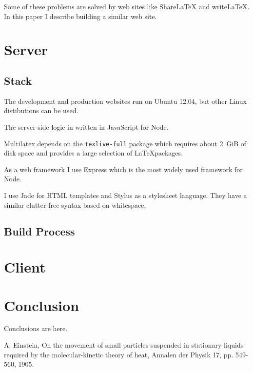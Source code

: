 \documentclass{llncs}
\begin{document}
Some of these problems are solved by web sites like \mbox{ShareLaTeX} and \mbox{writeLaTeX}. In this paper I describe building a similar web site.

\section{Server}

\subsection{Stack}

The development and production websites run on Ubuntu 12.04, but other Linux distibutions can be used.

The server-side logic in written in JavaScript for Node.

Multilatex depends on the \texttt{texlive-full} package which requires about 2~GiB of disk space and provides a large selection of \LaTeX packages.

As a web framework I use Express which is the most widely used framework for Node.

I use Jade for HTML templates and Stylus as a stylesheet language. They have a similar clutter-free syntax based on whitespace.

\subsection {Build Process}

\section{Client}



\section{Conclusion}

Conclusions are here.

\begin{thebibliography}{1}

A. Einstein, On the movement of small particles suspended in stationary liquids required by the molecular-kinetic theory of heat, Annalen der Physik 17, pp. 549-560, 1905.

\end{thebibliography}
\end{document}
